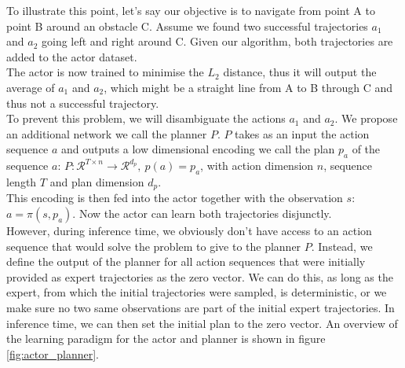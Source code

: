 To illustrate this point, let's say our objective 
is to navigate from point A to point B around an obstacle C. Assume we found two successful trajectories 
$a_1$ and $a_2$ going left and right around C. Given our algorithm, both trajectories are added to the actor dataset. \\

The actor is now trained to minimise the $L_2$ distance, thus it will output the average of $a_1$ and $a_2$, which might be a straight line from A to B 
through C and thus not a successful trajectory. \\

To prevent this problem, we will disambiguate the actions $a_1$ and $a_2$. We propose an additional network we call the planner $P$. $P$ takes as an input 
the action sequence $a$ and outputs a low dimensional encoding we call the plan $p_a$ of the sequence $a$: 
$P:\mathcal{R}^{T\times n} \rightarrow \mathcal{R}^{d_p},\ p(a) = p_a$, with action dimension $n$, sequence length $T$ and plan dimension $d_p$.\\ 
This encoding is then fed into the actor together 
with the observation $s$: $a = \pi(s, p_a)$. Now the actor can learn both trajectories disjunctly.\\ 

However, during inference time, we obviously don't have access to an action sequence 
that would solve the problem to give to the planner $P$. Instead, we define the output of the planner for all action sequences that were initially provided as 
expert trajectories as the zero vector. We can do this, as long as the expert, from which the initial trajectories were sampled, is deterministic, or we make sure 
no two same observations are part of the initial expert trajectories. In inference time, we can then set the initial plan to the zero vector. An overview of the learning 
paradigm for the actor and planner is shown in figure \ref{fig:actor_planner}.

